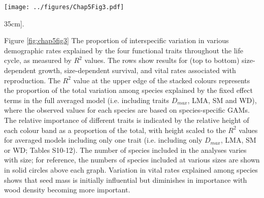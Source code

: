 \documentclass[b5paper,justified]{tufte-book} %
\begin{document}
\begin{fullwidth}
\begin{landscape}
\begin{figure*}
\hspace*{3.5cm} \texttt{[image: ../figures/Chap5Fig3.pdf]}
\caption[The proportion of interspecific variation in various demographic rates explained by the four functional traits][35cm]{.}
\label{fig:chap5fig3}
\hspace*{4cm} \begin{minipage}{20cm}
\footnotesize Figure \ref{fig:chap5fig3} 
The proportion of interspecific variation in various demographic rates explained by the four functional traits throughout the life cycle, as measured by $R^2$ values. The rows show results for (top to bottom) size-dependent growth, size-dependent survival, and vital rates associated with reproduction. The $R^2$  value at the upper edge of the stacked colours represents the proportion of the total variation among species explained by the fixed effect terms in the full averaged model (i.e. including traits $D_{max}$, LMA, SM and WD), where the observed
values for each species are based on species-specific GAMs. The relative importance of different traits is indicated by the relative height of each colour band as a proportion of the total, with height scaled to the $R^2$  values for averaged models including only one trait (i.e. including only $D_{max}$, LMA, SM or WD; Tables S10-12). The number of species included in the analyses varies with size; for reference, the numbers of species included at various sizes are shown in solid circles above each graph. Variation in vital rates explained among species shows that seed mass is initially influential but diminishes in importance with wood density becoming more important.
\end{minipage}
\end{figure*}
\end{landscape}




\end{fullwidth}
\end{document}
